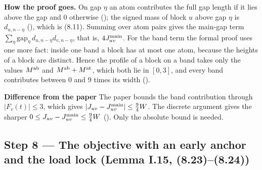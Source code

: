 \documentclass[11pt]{article}
\newcommand{\notelabel}[1]{{\sffamily\bfseries\small\color{noterule}#1}\quad}
\begin{document}
\textbf{How the proof goes.} On gap $\eta$ an atom contributes the full gap length if it lies
above the gap and $0$ otherwise (); the signed mass of block $u$ above gap $\eta$
is $d_{u,n-\eta}$ (), which is (8.11). Summing over atom pairs gives the
main-gap term $\sum_\eta \mathrm{gap}_\eta\, d_{u,n-\eta}d_{v,n-\eta}$, that is,
$4J^{\rm main}_{uv}$. For the band term the formal proof uses one more fact: inside one band a
block has at most one atom, because the heights of a block are distinct. Hence the profile of a
block on a band takes only the values $M^{\rm ab}$ and $M^{\rm ab}+M^{\rm at}$, which both lie in
$[0,3]$, and every band contributes between $0$ and $9$ times its width
().

\begin{notebox}
\notelabel{Difference from the paper}
The paper bounds the band contribution through $|F_v(t)|\le 3$, which gives
$|J_{uv}-J^{\rm main}_{uv}|\le\frac94W$. The discrete argument gives the sharper
$0\le J_{uv}-J^{\rm main}_{uv}\le\frac94W$ (). Only the absolute bound is
needed.
\end{notebox}

\subsection{Step 8 --- The objective with an early anchor and the load lock (Lemma I.15, (8.23)--(8.24))}\label{step:lock}
\end{document}
